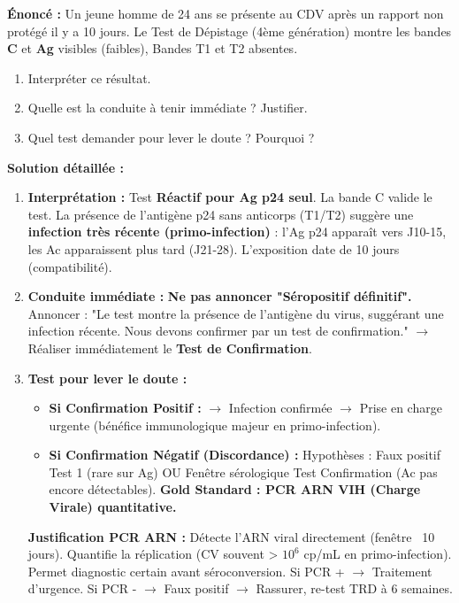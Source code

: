 \documentclass[11pt]{article}
\begin{document}
\begin{exoresolu}
\textbf{Énoncé :} Un jeune homme de 24 ans se présente au CDV après un rapport non protégé il y a 10 jours. Le Test de Dépistage (4ème génération) montre les bandes \textbf{C} et \textbf{Ag} visibles (faibles), Bandes T1 et T2 absentes.
\begin{enumerate}
    \item Interpréter ce résultat.
    \item Quelle est la conduite à tenir immédiate ? Justifier.
    \item Quel test demander pour lever le doute ? Pourquoi ?
\end{enumerate}
\tcblower
\textbf{Solution détaillée :}
\begin{enumerate}
    \item \textbf{Interprétation :} Test \textbf{Réactif pour Ag p24 seul}. La bande C valide le test. La présence de l'antigène p24 sans anticorps (T1/T2) suggère une \textbf{infection très récente (primo-infection)} : l'Ag p24 apparaît vers J10-15, les Ac apparaissent plus tard (J21-28). L'exposition date de 10 jours (compatibilité).
    \item \textbf{Conduite immédiate :} \textbf{Ne pas annoncer "Séropositif définitif".} Annoncer : "Le test montre la présence de l'antigène du virus, suggérant une infection récente. Nous devons confirmer par un test de confirmation." $\rightarrow$ Réaliser immédiatement le \textbf{Test de Confirmation}.
    \item \textbf{Test pour lever le doute :}
        \begin{itemize}
            \item \textbf{Si Confirmation Positif :} $\rightarrow$ Infection confirmée $\rightarrow$ Prise en charge urgente (bénéfice immunologique majeur en primo-infection).
            \item \textbf{Si Confirmation Négatif (Discordance) :} Hypothèses : Faux positif Test 1 (rare sur Ag) OU Fenêtre sérologique Test Confirmation (Ac pas encore détectables). \textbf{Gold Standard : PCR ARN VIH (Charge Virale) quantitative.}
        \end{itemize}
        \textbf{Justification PCR ARN :} Détecte l'ARN viral directement (fenêtre ~10 jours). Quantifie la réplication (CV souvent > $10^6$ cp/mL en primo-infection). Permet diagnostic certain avant séroconversion. Si PCR + $\rightarrow$ Traitement d'urgence. Si PCR - $\rightarrow$ Faux positif $\rightarrow$ Rassurer, re-test TRD à 6 semaines.
\end{enumerate}
\end{exoresolu}
\end{document}
